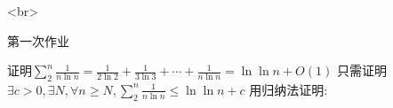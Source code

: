 <br>

第一次作业

证明$\sum_2^n\frac{1}{n\ln n}=\frac{1}{2\ln 2}+\frac{1}{3\ln 3}+\cdots+\frac{1}{n\ln n}=\ln\ln n+O(1)$
只需证明$\exists c>0, \exists N, \forall n\ge N, \sum_2^n\frac{1}{n\ln n}\le \ln\ln n+c$
用归纳法证明: 